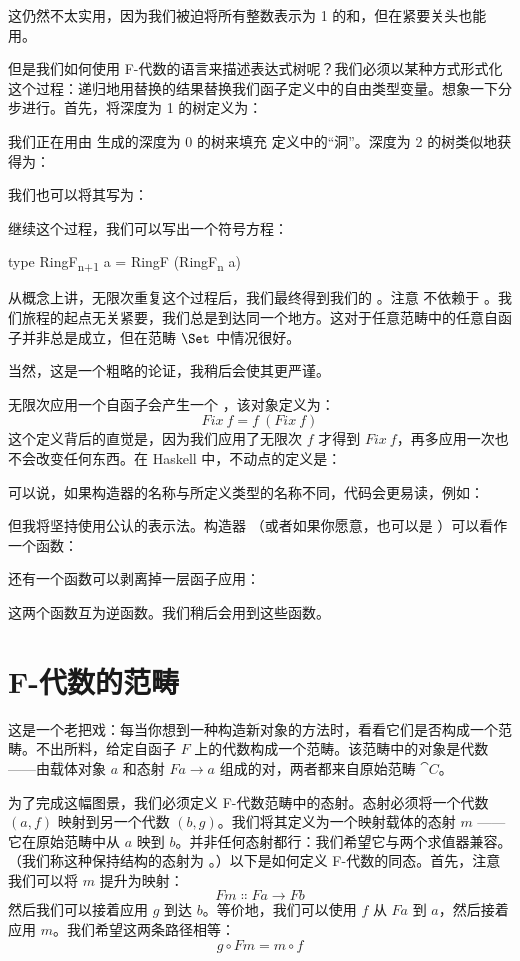 这仍然不太实用，因为我们被迫将所有整数表示为 1 的和，但在紧要关头也能用。

但是我们如何使用 F-代数的语言来描述表达式树呢？我们必须以某种方式形式化这个过程：递归地用替换的结果替换我们函子定义中的自由类型变量。想象一下分步进行。首先，将深度为 1 的树定义为：

我们正在用由  生成的深度为 0 的树来填充  定义中的“洞”。深度为 2 的树类似地获得为：

我们也可以将其写为：

继续这个过程，我们可以写出一个符号方程：

\begin{snipv}
type RingF\textsubscript{n+1} a = RingF (RingF\textsubscript{n} a)
\end{snipv}
从概念上讲，无限次重复这个过程后，我们最终得到我们的 。注意  不依赖于 。我们旅程的起点无关紧要，我们总是到达同一个地方。这对于任意范畴中的任意自函子并非总是成立，但在范畴 $\Set$ 中情况很好。

当然，这是一个粗略的论证，我稍后会使其更严谨。

无限次应用一个自函子会产生一个 ，该对象定义为：
\[\mathit{Fix}\ f = f\ (\mathit{Fix}\ f)\]
这个定义背后的直觉是，因为我们应用了无限次 $f$ 才得到 $\mathit{Fix}\ f$，再多应用一次也不会改变任何东西。在 Haskell 中，不动点的定义是：

可以说，如果构造器的名称与所定义类型的名称不同，代码会更易读，例如：

但我将坚持使用公认的表示法。构造器 （或者如果你愿意，也可以是 ）可以看作一个函数：

还有一个函数可以剥离掉一层函子应用：

这两个函数互为逆函数。我们稍后会用到这些函数。

\section{F-代数的范畴}

这是一个老把戏：每当你想到一种构造新对象的方法时，看看它们是否构成一个范畴。不出所料，给定自函子 $F$ 上的代数构成一个范畴。该范畴中的对象是代数——由载体对象 $a$ 和态射 $F a \to a$ 组成的对，两者都来自原始范畴 $\cat{C}$。

为了完成这幅图景，我们必须定义 F-代数范畴中的态射。态射必须将一个代数 $(a, f)$ 映射到另一个代数 $(b, g)$。我们将其定义为一个映射载体的态射 $m$ —— 它在原始范畴中从 $a$ 映到 $b$。并非任何态射都行：我们希望它与两个求值器兼容。（我们称这种保持结构的态射为 。）以下是如何定义 F-代数的同态。首先，注意我们可以将 $m$ 提升为映射：
\[F m \Colon F a \to F b\]
然后我们可以接着应用 $g$ 到达 $b$。等价地，我们可以使用 $f$ 从 $F a$ 到 $a$，然后接着应用 $m$。我们希望这两条路径相等：
\[g \circ F m = m \circ f\]

